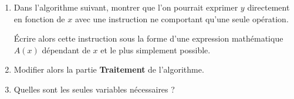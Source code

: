 \documentclass[10pt,openright,twoside,french]{book}
\begin{document}
\begin{enumerate}
    \item Dans l'algorithme suivant, montrer que l'on pourrait exprimer $y$ directement en fonction de $x$ avec une instruction ne comportant qu'une seule opération.\par
    \'Ecrire alors cette instruction sous la forme d'une expression mathématique $A(x)$ dépendant de $x$ et le plus simplement possible.

\begin{center}
\small
\end{center}

    \item Modifier alors la partie \textbf{Traitement} de l'algorithme.
    \item Quelles sont les seules variables nécessaires ?
\end{enumerate}
\end{document}
